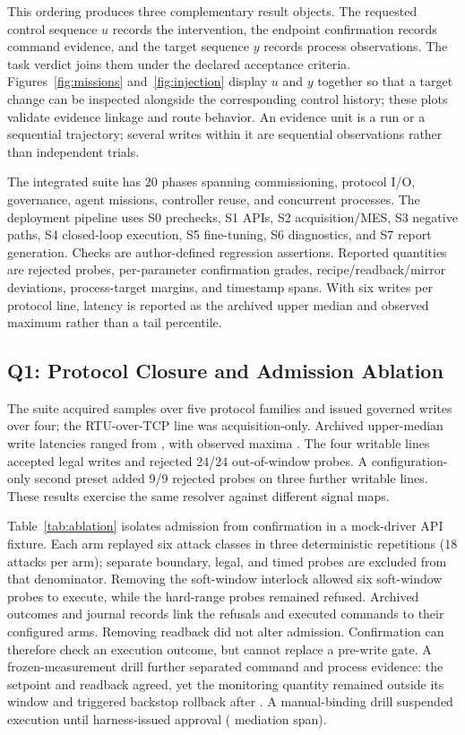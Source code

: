 This ordering produces three complementary result objects. The requested
control sequence $u$ records the intervention, the endpoint confirmation
records command evidence, and the target sequence $y$ records process
observations. The task verdict joins them under the declared acceptance
criteria. Figures~\ref{fig:missions} and~\ref{fig:injection} display $u$ and
$y$ together so that a target change can be inspected alongside the
corresponding control history; these plots validate evidence linkage and
route behavior. An evidence unit is a run or a sequential
trajectory; several writes within it are sequential observations rather
than independent trials.

The integrated suite has 20 phases spanning commissioning, protocol I/O,
governance, agent missions, controller reuse, and concurrent processes. The deployment
pipeline uses S0 prechecks, S1 APIs, S2 acquisition/MES, S3 negative paths,
S4 closed-loop execution, S5 fine-tuning, S6 diagnostics, and S7 report
generation. Checks are author-defined regression assertions. Reported
quantities are rejected probes, per-parameter confirmation grades,
recipe/readback/mirror deviations, process-target margins, and timestamp
spans. With six writes per protocol line, latency is reported as the archived
upper median and observed maximum rather than a tail percentile.

\subsection{Q1: Protocol Closure and Admission Ablation}
\label{sec:protocol}
The suite acquired \resDaqSamples{} samples over five protocol families and
issued governed writes over four; the RTU-over-TCP line was acquisition-only.
Archived upper-median write latencies ranged from \resPfiftyRange{}, with observed maxima
\resPninetyfiveRange{}. The four writable lines accepted legal writes and
rejected 24/24 out-of-window probes. A configuration-only second preset
added 9/9 rejected probes on three further writable lines. These results
exercise the same resolver against different signal maps.

Table~\ref{tab:ablation} isolates admission from confirmation in a
mock-driver API fixture. Each arm replayed six attack classes in three
deterministic repetitions (18 attacks per arm); separate boundary, legal,
and timed probes are excluded from that denominator. Removing the
soft-window interlock allowed six soft-window probes to execute, while
the hard-range probes remained refused. Archived outcomes and journal
records link the refusals and executed commands to their configured arms.
Removing readback did not alter admission. Confirmation can therefore
check an execution outcome, but cannot replace a pre-write gate. A frozen-measurement drill further
separated command and process evidence: the setpoint and readback agreed,
yet the monitoring quantity remained outside its window and triggered
backstop rollback after \resBackstop{}. A manual-binding drill suspended
execution until harness-issued approval (\resHitlLatency{} mediation span).

